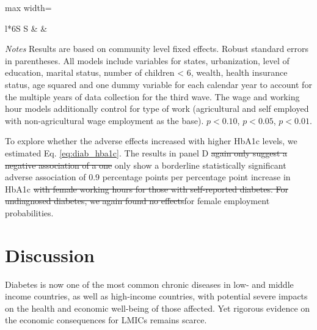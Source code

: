 \documentclass[12pt,english]{article}
\providecommand{\DIFaddtex}[1]{{\protect\color{blue}#1}} %
\providecommand{\DIFdeltex}[1]{{\protect\color{red}\sout{#1}}}                      %
\providecommand{\DIFaddbegin}{} %
\providecommand{\DIFaddend}{} %
\providecommand{\DIFdelbegin}{} %
\providecommand{\DIFdelend}{} %
\providecommand{\DIFaddbeginFL}{} %
\providecommand{\DIFaddendFL}{} %
\providecommand{\DIFdelbeginFL}{} %
\providecommand{\DIFdelendFL}{} %
\providecommand{\DIFadd}[1]{\texorpdfstring{\DIFaddtex{#1}}{#1}} %
\providecommand{\DIFdel}[1]{\texorpdfstring{\DIFdeltex{#1}}{}} %
\begin{document}
\begin{table}[!ht]
\begin{center}
\begin{adjustbox}{max width=\linewidth}
\begin{threeparttable}
{\begin{tabular}{l*{6}{S
								S}}
\DIFdelendFL \DIFaddbeginFL {}         \DIFaddendFL &\DIFdelbeginFL %
\DIFdelendFL \DIFaddbeginFL {}         \DIFaddendFL &\DIFdelbeginFL %
\DIFdelendFL \DIFaddbeginFL {}         \DIFaddendFL \\
						\bottomrule
					\end{tabular}
					\begin{tablenotes}
						\item \footnotesize \textit{Notes} Results are based on community level fixed effects. Robust standard errors in parentheses. All models include variables for  states, urbanization, level of education, marital status, number of children < 6, wealth, health insurance status, age squared and one dummy variable for each calendar year to account for the multiple years of data collection for the third wave. The wage and working hour models additionally control for type of work (agricultural and self employed with non-agricultural wage employment as the base). \sym{*} \(p<0.10\), \sym{**} \(p<0.05\), \sym{***} \(p<0.01\).
					\end{tablenotes}
				}
			\end{threeparttable}
		\end{adjustbox}
	\end{center}
\end{table}


To explore whether the adverse effects increased with higher \ac{HbA1c} levels, we estimated Eq. \ref{eq:diab_hba1c}. The results in panel D \DIFdelbegin \DIFdel{again only suggest a negative association of a one }\DIFdelend \DIFaddbegin \DIFadd{only show a borderline statistically significant adverse association of 0.9 percentage points per }\DIFaddend percentage point increase in \ac{HbA1c} \DIFdelbegin \DIFdel{with female working hours for those with self-reported diabetes. For undiagnosed diabetes, we again found no effects}\DIFdelend \DIFaddbegin \DIFadd{for female employment probabilities}\DIFaddend .


\FloatBarrier

\section{\label{sec:cha_4_conclusion}Discussion}

Diabetes is now one of the most common chronic diseases in low- and middle income countries, as well as high-income countries, with potential severe impacts on the health and economic well-being of those affected.  Yet rigorous evidence on the economic consequences for \acp{LMIC} remains scarce.
\end{document}
